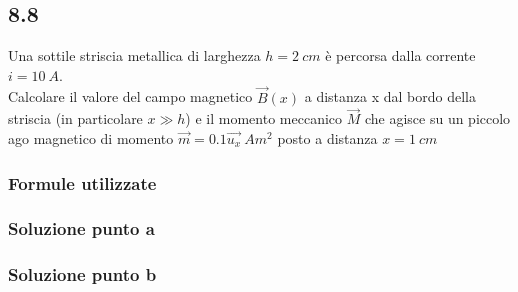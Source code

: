 \documentclass[../../main.tex]{subfiles}
\begin{document}
\subsection*{8.8}
Una sottile striscia metallica di larghezza $h = 2\ cm$ è percorsa dalla corrente $i = 10\ A$.\\
Calcolare il valore del campo magnetico $\vec{B}(x)$ a distanza x dal bordo della striscia (in particolare $x\gg h$) e il momento meccanico $\vec{M}$ che agisce su un piccolo ago magnetico di momento $\vec{m} = 0.1\vec{u_x}\ Am^2$ posto a distanza $x = 1\ cm$
\subsubsection*{Formule utilizzate}
\subsubsection*{Soluzione punto a}
\subsubsection*{Soluzione punto b}
\newpage
\end{document}
